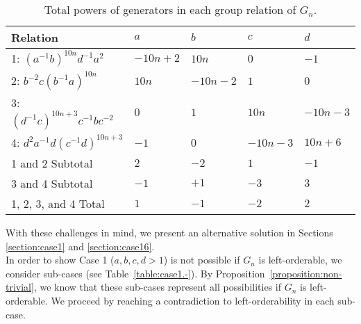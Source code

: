 \begin{table}[ht]
\begin{center}
\begin{tabular}{l | l | l | l | l}
Relation \hspace{10 pt} & $a$\hspace{10 pt} & $b$\hspace{10 pt} & $c$\hspace{10 pt} & $d$\hspace{10 pt} \\\hline\hline
1: $(a^{-1}b)^{10n}d^{-1}a^{2}$ & $-10n+2$ & $10n$ & $0$ & $-1$ \\\hline
2: $b^{-2}c(b^{-1}a)^{10n}$ & $10n$ & $-10n-2$ & $1$ & $0$ \\\hline
3: $(d^{-1}c)^{10n+3}c^{-1}bc^{-2}$ & $0$ & $1$ & $10n$ & $-10n-3$ \\\hline
4: $d^{2}a^{-1}d(c^{-1}d)^{10n+3}$ & $-1$ & $0$ & $-10n-3$ & $10n+6$ \\\hline
1 and 2 Subtotal & $2$ & $-2$ & $1$ & $-1$ \\\hline
3 and 4 Subtotal & $-1$ & $+1$ & $-3$ & $3$ \\\hline
1, 2, 3, and 4 Total & $1$ & $-1$ & $-2$ & $2$
\end{tabular}
\end{center}
\caption{Total powers of generators in each group relation of $G_n$.}
\label{table:generator_powers}
\end{table}

\noindent{}With these challenges in mind, we present an alternative solution in Sections \ref{section:case1} and \ref{section:case16}.\\

\noindent{}In order to show Case 1 ($a,b,c,d>1$) is not possible if $G_n$ is left-orderable, we consider sub-cases (see Table~\ref{table:case1.-}). By Proposition~\ref{proposition:non-trivial}, we know that these sub-cases represent all possibilities if $G_n$ is left-orderable. We proceed by reaching a contradiction to left-orderability in each sub-case.\\

